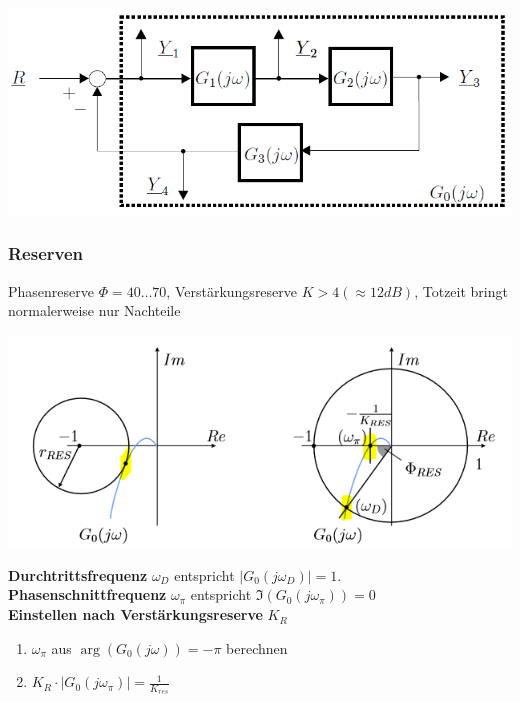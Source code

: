 \begin{center}
	\includegraphics[width=\columnwidth]{Images/kreisschaltung}\\
\end{center}

\subsubsection{Reserven}
 Phasenreserve $\Phi = 40\dots70$, Verstärkungsreserve $K > 4 (\approx 12dB)$, Totzeit bringt normalerweise nur Nachteile
\begin{center}
	\includegraphics[width=\columnwidth]{Images/reserve}
\end{center}
\textbf{Durchtrittsfrequenz} $\omega_D$ entspricht $\left|G_0(j\omega_D)\right| = 1$.\\
\textbf{Phasenschnittfrequenz} $\omega_\pi$ entspricht $\Im(G_0(j\omega_\pi)) = 0$~\\

\noindent\textbf{Einstellen nach Verstärkungsreserve} $K_{R}$
\begin{enumerate}[nosep]
	\item $\omega_\pi$ aus $\arg(G_0(j\omega)) = -\pi$ berechnen
	\item $K_R \cdot \left|G_0(j\omega_\pi)\right| = \frac{1}{K_{res}}$
\end{enumerate}~\\


